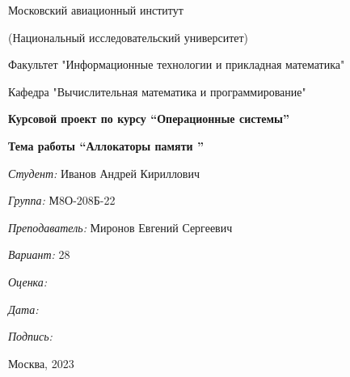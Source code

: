 \documentclass[a4paper, 12pt]{article}
\begin{document}
\thispagestyle{empty}	
\begin{center}
	Московский авиационный институт
	
	(Национальный исследовательский университет)
	
	Факультет "Информационные технологии и прикладная математика"
	
	Кафедра "Вычислительная математика и программирование"
	
\end{center}
\vspace{40ex}
\begin{center}
	\textbf{\large{Курсовой проект по курсу \linebreak \textquotedblleft Операционные системы\textquotedblright}}

    \vspace{1ex}    
    \textbf{\large{Тема работы \linebreak \textquotedblleft Аллокаторы памяти \textquotedblright}}
\end{center}
\vspace{29ex}
\begin{flushright}
	\textit{Студент: } Иванов Андрей Кириллович
	
	\vspace{2ex}
	\textit{Группа: } М8О-208Б-22
	
	\vspace{2ex}
	\textit{Преподаватель: } Миронов Евгений Сергеевич
	
	\vspace{2ex}
	\textit{Вариант: } 28
	
	\vspace{2ex}
	\textit{Оценка: } \underline{\quad\quad\quad\quad\quad\quad}
	
	 \vspace{2ex}
	\textit{Дата: } \underline{\quad\quad\quad\quad\quad\quad}
	
	\vspace{2ex}
	\textit{Подпись: } \underline{\quad\quad\quad\quad\quad\quad}
	
\end{flushright}

\vspace{5ex}

\begin{vfill}
	\begin{center}
		Москва, 2023
	\end{center}	
\end{vfill}
\newpage

\begingroup
\color{black}
\tableofcontents\newpage
\endgroup
\end{document}
